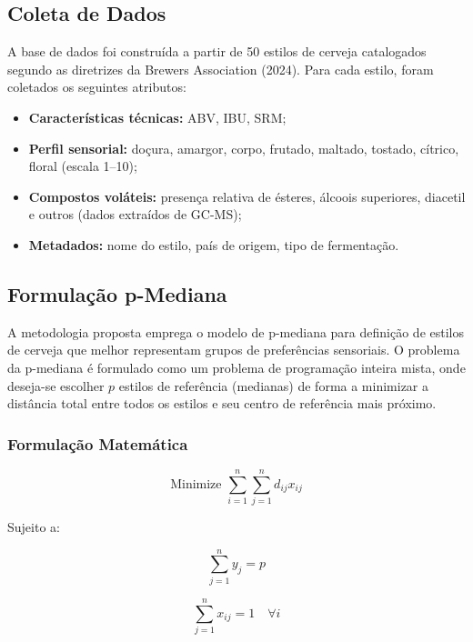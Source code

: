 \documentclass[12pt,a4paper]{article}
\begin{document}
\subsection{Coleta de Dados}

A base de dados foi constru\'ida a partir de 50 estilos de cerveja catalogados segundo as diretrizes da Brewers Association (2024). Para cada estilo, foram coletados os seguintes atributos:

\begin{itemize}
    \item \textbf{Caracter\'isticas t\'ecnicas:} ABV, IBU, SRM;
    \item \textbf{Perfil sensorial:} do\c{c}ura, amargor, corpo, frutado, maltado, tostado, c\'itrico, floral (escala 1--10);
    \item \textbf{Compostos vol\'ateis:} presen\c{c}a relativa de \'esteres, \'{a}lcoois superiores, diacetil e outros (dados extra\'idos de GC-MS);
    \item \textbf{Metadados:} nome do estilo, pa\'is de origem, tipo de fermenta\c{c}\~ao.
\end{itemize}

\subsection{Formula\c{c}\~ao p-Mediana}

A metodologia proposta emprega o modelo de p-mediana para defini\c{c}\~ao de estilos de cerveja que melhor representam grupos de prefer\^encias sensoriais. O problema da p-mediana \'{e} formulado como um problema de programa\c{c}\~ao inteira mista, onde deseja-se escolher $p$ estilos de refer\^encia (medianas) de forma a minimizar a dist\^ancia total entre todos os estilos e seu centro de refer\^encia mais pr\'oximo.

\subsubsection{Formula\c{c}\~ao Matem\'atica}

\begin{equation}
\text{Minimize } \sum_{i=1}^{n} \sum_{j=1}^{n} d_{ij} x_{ij}
\end{equation}

Sujeito a:

\begin{equation}
\sum_{j=1}^{n} y_j = p
\end{equation}

\begin{equation}
\sum_{j=1}^{n} x_{ij} = 1 \quad \forall i
\end{equation}
\end{document}
